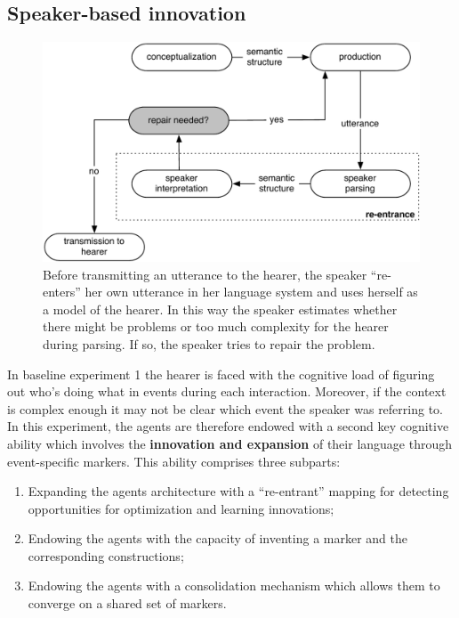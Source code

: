 \subsection{Speaker-based innovation}

\begin{figure}[t]
\centerline{\includegraphics[width=\linewidth]{Chapter3/figs/re-entrance}}
  \caption[Speaker re-entrance]{Before transmitting an utterance to the hearer, the speaker ``re-enters'' her own utterance in her language system and uses herself as a model of the hearer. In this way the speaker estimates whether there might be problems or too much complexity for the hearer during parsing. If so, the speaker tries to repair the problem.}
   \label{f:re-entrance}
\end{figure}

In baseline experiment 1 the hearer is faced with the cognitive load of figuring out who's doing what in events during each interaction. Moreover, if the context is complex enough it may not be clear which event the speaker was referring to. In this experiment, the agents are therefore endowed with a second key cognitive ability which involves the {\bfseries innovation and expansion} of their language through event-specific markers. This ability comprises three subparts:

\begin{enumerate}
\item Expanding the agents architecture with a ``re-entrant'' mapping for detecting opportunities for optimization and learning innovations;
\item Endowing the agents with the capacity of inventing a marker and the corresponding constructions;
\item Endowing the agents with a consolidation mechanism which allows them to converge on a shared set of markers.  
\end{enumerate}

